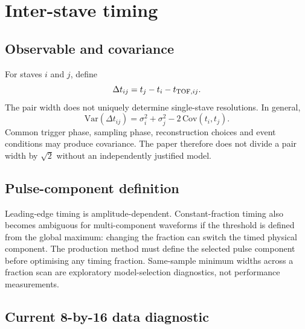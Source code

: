 \section{Inter-stave timing}

\subsection{Observable and covariance}

For staves \(i\) and \(j\), define
\[
\Delta t_{ij}=t_j-t_i-t_{{\rm TOF},ij}.
\]
The pair width does not uniquely determine single-stave resolutions. In general,
\[
\mathrm{Var}(\Delta t_{ij})=\sigma_i^2+\sigma_j^2-2\,\mathrm{Cov}(t_i,t_j).
\]
Common trigger phase, sampling phase, reconstruction choices and event conditions may produce covariance. The paper therefore does not divide a pair width by \(\sqrt{2}\) without an independently justified model.

\subsection{Pulse-component definition}

Leading-edge timing is amplitude-dependent. Constant-fraction timing also becomes ambiguous for multi-component waveforms if the threshold is defined from the global maximum: changing the fraction can switch the timed physical component. The production method must define the selected pulse component before optimising any timing fraction. Same-sample minimum widths across a fraction scan are exploratory model-selection diagnostics, not performance measurements.

\subsection{Current 8-by-16 data diagnostic}

